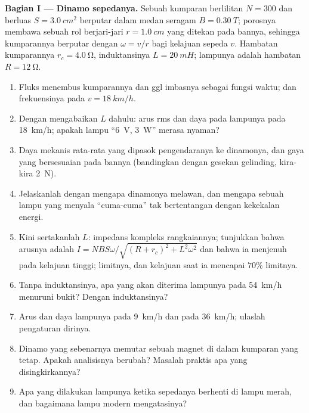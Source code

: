 \begin{problem}
\medskip
\noindent\textbf{Bagian I --- Dinamo sepedanya.}
Sebuah kumparan berlilitan $N = 300$ dan berluas $S = \qty{3.0}{cm^2}$ berputar dalam
medan seragam $B = \qty{0.30}{T}$; porosnya membawa sebuah rol berjari-jari
$r = \qty{1.0}{cm}$ yang ditekan pada bannya, sehingga kumparannya berputar dengan
$\omega = v/r$ bagi kelajuan sepeda $v$. Hambatan kumparannya $r_c = \qty{4.0}{\ohm}$,
induktansinya $L = \qty{20}{mH}$; lampunya adalah hambatan $R = \qty{12}{\ohm}$.
\begin{enumerate}
  \item Fluks menembus kumparannya dan ggl imbasnya sebagai fungsi waktu;
         dan frekuensinya pada $v = \qty{18}{km/h}$.
  \item Dengan mengabaikan $L$ dahulu: arus rms dan daya pada lampunya pada
        \qty{18}{km/h}; apakah lampu ``\qty{6}{V}, \qty{3}{W}'' merasa nyaman?
  \item Daya mekanis rata-rata yang dipasok pengendaranya ke dinamonya, dan
        gaya yang bersesuaian pada bannya (bandingkan dengan gesekan
        gelinding, kira-kira \qty{2}{N}).
  \item Jelaskanlah dengan  mengapa dinamonya melawan, dan mengapa sebuah lampu
        yang menyala ``cuma-cuma'' tak bertentangan dengan kekekalan energi.
  \item Kini sertakanlah $L$: impedans kompleks rangkaiannya; tunjukkan bahwa
         arusnya adalah $I = NBS\omega/\sqrt{(R + r_c)^2 + L^2\omega^2}$
        dan bahwa ia menjenuh pada kelajuan tinggi; limitnya, dan
        kelajuan saat ia mencapai $70\%$ limitnya.
  \item Tanpa induktansinya, apa yang akan diterima lampunya pada
        \qty{54}{km/h} menuruni bukit? Dengan induktansinya?
  \item Arus dan daya lampunya pada \qty{9}{km/h} dan pada \qty{36}{km/h}; ulaslah
        pengaturan dirinya.
  \item Dinamo yang sebenarnya memutar sebuah magnet di dalam kumparan yang tetap. Apakah
        analisisnya berubah? Masalah praktis apa yang disingkirkannya?
  \item Apa yang dilakukan lampunya ketika sepedanya berhenti di lampu merah,
        dan bagaimana lampu modern mengatasinya?
\end{enumerate}


\end{problem}
